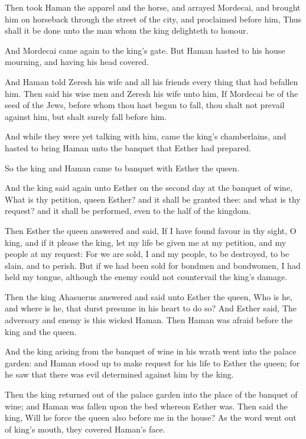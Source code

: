 \Verse Then took Haman the apparel and the horse, and arrayed Mordecai, and brought him on horseback through the street of the city, and proclaimed before him, Thus shall it be done unto the man whom the king delighteth to honour.

\Verse And Mordecai came again to the king's gate. But Haman hasted to his house mourning, and having his head covered.

\Verse And Haman told Zeresh his wife and all his friends every thing that had befallen him. Then said his wise men and Zeresh his wife unto him, If Mordecai be of the seed of the Jews, before whom thou hast begun to fall, thou shalt not prevail against him, but shalt surely fall before him.

\Verse And while they were yet talking with him, came the king's chamberlains, and hasted to bring Haman unto the banquet that Esther had prepared.


\Chapter
\Verse So the king and Haman came to banquet with Esther the queen.

\Verse And the king said again unto Esther on the second day at the banquet of wine, What is thy petition, queen Esther? and it shall be granted thee: and what is thy request? and it shall be performed, even to the half of the kingdom.

\Verse Then Esther the queen answered and said, If I have found favour in thy sight, O king, and if it please the king, let my life be given me at my petition, and my people at my request: \Verse For we are sold, I and my people, to be destroyed, to be slain, and to perish. But if we had been sold for bondmen and bondwomen, I had held my tongue, although the enemy could not countervail the king's damage.

\Verse Then the king Ahasuerus answered and said unto Esther the queen, Who is he, and where is he, that durst presume in his heart to do so?  \Verse And Esther said, The adversary and enemy is this wicked Haman.  Then Haman was afraid before the king and the queen.

\Verse And the king arising from the banquet of wine in his wrath went into the palace garden: and Haman stood up to make request for his life to Esther the queen; for he saw that there was evil determined against him by the king.

\Verse Then the king returned out of the palace garden into the place of the banquet of wine; and Haman was fallen upon the bed whereon Esther was. Then said the king, Will he force the queen also before me in the house? As the word went out of king's mouth, they covered Haman's face.

